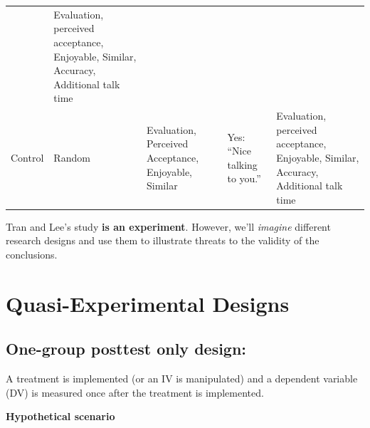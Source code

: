 \documentclass[
  english,
]{book}
\begin{document}
\begin{longtable}[]{@{}lllll@{}}
\begin{minipage}[t]{0.15\columnwidth}
\end{minipage} & \begin{minipage}[t]{0.22\columnwidth}\raggedright
Evaluation, perceived acceptance, Enjoyable, Similar, Accuracy, Additional talk time\strut
\end{minipage}\tabularnewline
\begin{minipage}[t]{0.10\columnwidth}\raggedright
Control\strut
\end{minipage} & \begin{minipage}[t]{0.17\columnwidth}\raggedright
Random\strut
\end{minipage} & \begin{minipage}[t]{0.22\columnwidth}\raggedright
Evaluation, Perceived Acceptance, Enjoyable, Similar\strut
\end{minipage} & \begin{minipage}[t]{0.15\columnwidth}\raggedright
Yes: ``Nice talking to you.''\strut
\end{minipage} & \begin{minipage}[t]{0.22\columnwidth}\raggedright
Evaluation, perceived acceptance, Enjoyable, Similar, Accuracy, Additional talk time\strut
\end{minipage}\tabularnewline
\bottomrule
\end{longtable}

Tran and Lee's \citeyearpar{tran_you_2014} study \textbf{is an experiment}. However, we'll \emph{imagine} different research designs and use them to illustrate threats to the validity of the conclusions.

\hypertarget{quasi-experimental-designs}{%
\section{Quasi-Experimental Designs}\label{quasi-experimental-designs}}

\hypertarget{one-group-posttest-only-design}{%
\subsection{One-group posttest only design:}\label{one-group-posttest-only-design}}

A treatment is implemented (or an IV is manipulated) and a dependent variable (DV) is measured once after the treatment is implemented.

\textbf{Hypothetical scenario}
\end{document}
